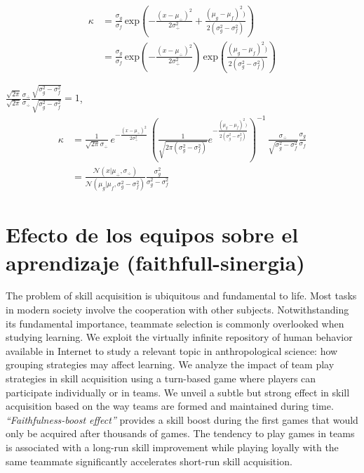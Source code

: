 \documentclass[a4paper,10pt]{book}
\newcommand{\N}{\mathcal{N}}
\theoremstyle{definition}
\newif\ifen
\newif\ifes
\newcommand{\en}[1]{\ifen#1\fi}
\newcommand{\es}[1]{\ifes#1\fi}
\begin{document}
\en{Returning to the original expression}
\begin{equation}
\begin{split}
 \kappa & = \frac{\sigma_g}{\sigma_f}  \, \text{exp}\left(- \frac{(x - \mu_{\div})^2}{2\sigma_{\div}^2} + \frac{(\mu_g - \mu_f)^2)}{2(\sigma_g^2 - \sigma_f^2)}  \right)\\[0.3cm]
 & = \frac{\sigma_g}{\sigma_f} \, \text{exp}\left({-\frac{(x - \mu_{\div})^2}{2\sigma_{\div}^2}}\right) \, \text{exp}\left({\frac{(\mu_g - \mu_f)^2)}{2(\sigma_g^2 - \sigma_f^2)}}\right)
\end{split}
\end{equation}

\en{Multiplying by} $\frac{\sqrt{2\pi}}{\sqrt{2\pi}}\frac{\sigma_{\div}}{\sigma_{\div}}\frac{\sqrt{\sigma_g^2 - \sigma_f^2}}{\sqrt{\sigma_g^2 - \sigma_f^2}}=1$,
\begin{equation}
\begin{split}
 \kappa & =  \frac{1}{\sqrt{2\pi}\sigma_{\div}} \, e^{-\frac{(x - \mu_{\div})^2}{2\sigma_{\div}^2}} \, \left( \frac
 {1}{\sqrt{2\pi(\sigma_g^2 - \sigma_f^2)} } e^{-\frac{(\mu_g - \mu_f)^2)}{2(\sigma_g^2 - \sigma_f^2)}} \right)^{-1} \, \frac{\sigma_{\div}}{\sqrt{\sigma_g^2 - \sigma_f^2}}\frac{\sigma_g}{\sigma_f}\\[0.3cm]
 & = \frac{\N\left(x| \mu_{\div},\sigma_{\div}\right)}{\N\left(\mu_g|\mu_f,\sigma_g^2-\sigma_f^2\right)} \frac{\sigma_g^2}{\sigma_g^2 - \sigma_f^2}
\end{split}
\end{equation}


\chapter{Efecto de los equipos sobre el aprendizaje (faithfull-sinergia)} \label{ch:team}



The problem of skill acquisition is ubiquitous and fundamental to life.
Most tasks in modern society involve the cooperation with other subjects. 
Notwithstanding its fundamental importance, teammate selection is commonly overlooked when studying learning.
We exploit the virtually infinite repository of human behavior available in Internet to study a relevant topic in anthropological science: how grouping strategies may affect learning.
We analyze the impact of team play strategies in skill acquisition using a turn-based game where players can participate individually or in teams.
We unveil a subtle but strong effect in skill acquisition based on the way teams are formed and maintained during time.
\emph{``Faithfulness-boost effect''} provides a skill boost during the first games that would only be acquired after thousands of games.
The tendency to play games in teams is associated with a long-run skill improvement while playing loyally with the same teammate significantly accelerates short-run skill acquisition.
\end{document}
